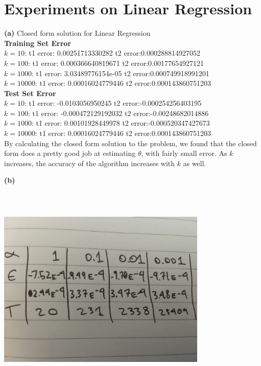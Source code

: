 \documentclass[11pt]{article}
\begin{document}
\section*{Experiments on Linear Regression\\}
\textbf{(a)} Closed form solution for Linear Regression\\
\textbf{Training Set Error\\}
$k = 10$: t1 error: 0.00251713330282 t2 error:0.000288814927052\\
$k = 100$: t1 error: 0.000366640819671 t2 error:0.00177654927121\\
$k = 1000$: t1 error: 3.03489776154e-05 t2 error:0.000749918991201\\
$k = 10000$: t1 error: 0.00016024779446 t2 error:0.000143860751203\\

\textbf{Test Set Error\\}
$k = 10$: t1 error: -0.0103056950245 t2 error:-0.000254256403195\\
$k = 100$: t1 error: -0.000472129192032 t2 error:-0.00248682014886\\
$k = 1000$: t1 error: 0.00101928449978 t2 error:-0.000520347427673\\
$k = 10000$: t1 error: 0.00016024779446 t2 error:0.000143860751203\\

By calculating the closed form solution to the problem, we found that the closed form does a pretty good job at estimating $\theta$, with fairly small error. As $k$ increases, the accuracy of the algorithm increases with $k$ as well.

\textbf{(b)}
\begin{center}
\includegraphics[width=10cm,height=10cm,keepaspectratio]{3b} \end{center}
\end{document}
